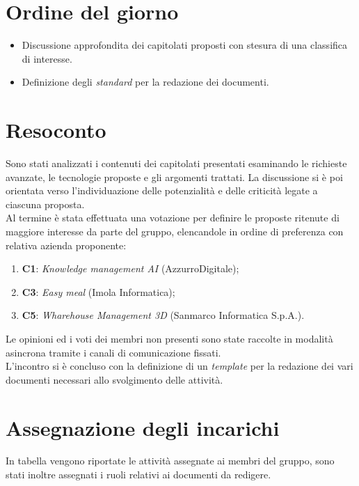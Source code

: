\section{Ordine del giorno}
\begin{itemize}
    \item Discussione approfondita dei capitolati proposti con stesura di una classifica di interesse.
    \item Definizione degli \textit{standard} per la redazione dei documenti.
\end{itemize}

\section{Resoconto}
Sono stati analizzati i contenuti dei capitolati presentati esaminando le richieste avanzate, le tecnologie proposte e gli argomenti trattati.
La discussione si è poi orientata verso l'individuazione delle potenzialità e delle criticità legate a ciascuna proposta. \\
\noindent
Al termine è stata effettuata una votazione per definire le proposte ritenute di maggiore interesse da parte del gruppo, elencandole in ordine di preferenza con relativa azienda proponente:
\begin{enumerate}
    \item \textbf{C1}: \textit{Knowledge management AI} (AzzurroDigitale);
    \item \textbf{C3}: \textit{Easy meal} (Imola Informatica);
    \item \textbf{C5}: \textit{Wharehouse Management 3D} (Sanmarco Informatica S.p.A.).
\end{enumerate}
Le opinioni ed i voti dei membri non presenti sono state raccolte in modalità asincrona tramite i canali di comunicazione fissati.\\
\noindent
L'incontro si è concluso con la definizione di un \textit{template} per la redazione dei vari documenti necessari allo svolgimento delle attività.

\section{Assegnazione degli incarichi}
In tabella vengono riportate le attività assegnate ai membri del gruppo, sono stati inoltre assegnati i ruoli relativi ai documenti da redigere.

